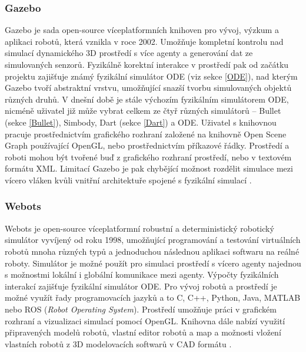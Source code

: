 \subsubsection{Gazebo} \label{Gazebo}
Gazebo \citep{gazeborobotics} je sada open-source víceplatformních knihoven pro
vývoj, výzkum a aplikaci robotů, která vznikla v roce 2002. Umožňuje kompletní
kontrolu nad simulací dynamického 3D prostředí s více agenty a generování dat
ze simulovaných senzorů. Fyzikálně korektní interakce v prostředí pak od
začátku projektu zajišťuje známý fyzikální simulátor ODE (viz sekce \ref{ODE}),
nad kterým Gazebo tvoří abstraktní vrstvu, umožňující snazší tvorbu
simulovaných objektů různých druhů. V dnešní době je stále výchozím fyzikálním
simulátorem ODE, nicméně uživatel již může vybrat celkem ze čtyř různých
simulátorů -- Bullet (sekce \ref{Bullet}), Simbody, Dart (sekce \ref{Dart}) a
ODE. Uživatel s knihovnou pracuje prostřednictvím grafického rozhraní založené
na knihovně Open Scene Graph používající OpenGL, nebo prostřednictvím příkazové
řádky. Prostředí a roboti mohou být tvořené buď z grafického rozhraní
prostředí, nebo v textovém formátu XML. Limitací Gazebo je pak chybějící
možnost rozdělit simulace mezi vícero vláken kvůli vnitřní architektuře spojené
s fyzikální simulací \citep{koenig2004design}. 

\subsubsection{Webots} \label{Webots}
Webots \citep{Webots} je open-source víceplatformní robustní a deterministický
robotický simulátor vyvíjený od roku 1998, umožňující programování a testování
virtuálních robotů mnoha různých typů a jednoduchou následnou aplikaci softwaru
na reálné roboty. Simulátor je možné použít pro simulaci prostředí s vícero
agenty najednou s možnostmi lokální i globální komunikace mezi agenty. Výpočty
fyzikálních interakcí zajišťuje fyzikální simulátor ODE. Pro vývoj robotů a
prostředí je možné využít řady programovacích jazyků a to C, C++, Python, Java,
MATLAB nebo ROS (\emph{Robot Operating System}). Prostředí umožňuje práci v
grafickém rozhraní a vizualizaci simulací pomocí OpenGL. Knihovna dále nabízí
využití připravených modelů robotů, vlastní editor robotů a map a možnosti
vložení vlastních robotů z 3D modelovacích softwarů v CAD formátu
\citep{michel2004cyberbotics}.

